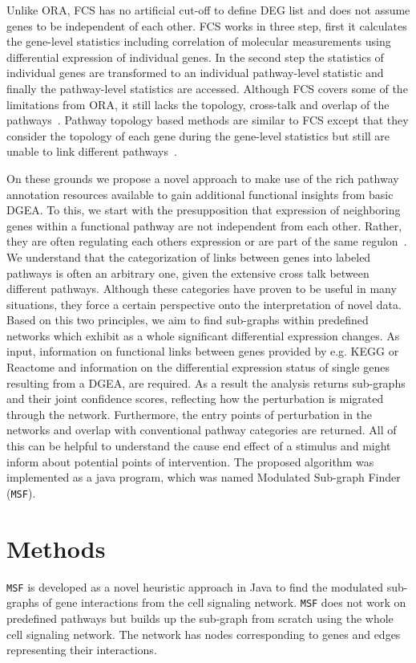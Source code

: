 \documentclass[twocolumn]{article}
\begin{document}
Unlike ORA, FCS has no artificial cut-off to define DEG list and does
not assume genes to be independent of each other. FCS works in three
step, first it calculates the gene-level statistics including correlation of molecular measurements  using differential expression of individual genes. In the second step the statistics of individual genes are transformed to an individual pathway-level statistic and finally the
pathway-level statistics are accessed. Although FCS covers some of the
limitations from ORA, it still lacks the topology, cross-talk and
overlap of the pathways~\cite{Khatri2012,Campos}. Pathway topology
based methods are similar to FCS except that they consider the
topology of each gene during the gene-level
statistics but still are unable to link different pathways~\cite{Khatri2012}.

On these grounds we propose a novel approach to make use of the rich
pathway annotation resources available to gain additional functional
insights from basic DGEA. To this, we
start with the presupposition that expression of neighboring genes
within a functional pathway are not independent from each
other. Rather, they are often regulating each others expression or are
part of the same regulon~\cite{Michalak}. We
understand that the categorization of links between genes into labeled
pathways is often an arbitrary one, given the extensive cross talk
between different pathways. Although these categories have proven to be
useful in many situations, they force a certain perspective onto the
interpretation of novel data. Based on this two principles, we aim to
find sub-graphs within predefined networks which exhibit as a whole
significant differential expression changes. As input, information on
functional links between genes provided by e.g. KEGG or Reactome and
information on the differential expression status of single genes
resulting from a DGEA, are required. As a result the analysis returns
sub-graphs and their joint confidence scores, reflecting how the
perturbation is migrated through the network. Furthermore, the entry
points of perturbation in the networks and overlap with conventional
pathway categories are returned. All of this can be helpful to
understand the cause end effect of a stimulus and might inform about
potential points of intervention. The proposed algorithm was
implemented as a java program, which was named Modulated Sub-graph
Finder (\texttt{MSF}).

\section*{Methods}
\texttt{MSF} is developed as a novel heuristic approach in Java to
find the modulated sub-graphs of gene interactions from the cell
signaling network. \texttt{MSF} does not work on predefined pathways but builds up the sub-graph from scratch using the whole cell signaling network. The network has nodes corresponding to genes and
edges representing their interactions. 
\end{document}
